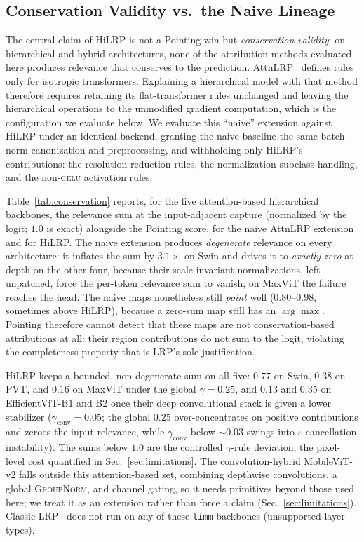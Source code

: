 \documentclass[lettersize,journal]{IEEEtran}
\theoremstyle{definition}
\theoremstyle{plain}
\begin{document}
\subsection{Conservation Validity vs.\ the Naive Lineage}
\label{sec:conservation-validity}
The central claim of HiLRP is not a Pointing win but \emph{conservation validity}: on hierarchical and hybrid architectures, none of the attribution methods evaluated here produces relevance that conserves to the prediction. AttnLRP~\cite{achtibat2024attnlrp} defines rules only for isotropic transformers. Explaining a hierarchical model with that method therefore requires retaining its flat-transformer rules unchanged and leaving the hierarchical operations to the unmodified gradient computation, which is the configuration we evaluate below. We evaluate this ``naive'' extension against HiLRP under an identical backend, granting the naive baseline the same batch-norm canonization and preprocessing, and withholding only HiLRP's contributions: the resolution-reduction rules, the normalization-subclass handling, and the non-\textsc{gelu} activation rules.

Table~\ref{tab:conservation} reports, for the five attention-based hierarchical backbones, the relevance sum at the input-adjacent capture (normalized by the logit; $1.0$ is exact) alongside the Pointing score, for the naive AttnLRP extension and for HiLRP. The naive extension produces \emph{degenerate} relevance on every architecture: it inflates the sum by $3.1\times$ on Swin and drives it to \emph{exactly zero} at depth on the other four, because their scale-invariant normalizations, left unpatched, force the per-token relevance sum to vanish; on MaxViT the failure reaches the head. The naive maps nonetheless still \emph{point} well ($0.80$--$0.98$, sometimes above HiLRP), because a zero-sum map still has an $\arg\max$. Pointing therefore cannot detect that these maps are not conservation-based attributions at all: their region contributions do not sum to the logit, violating the completeness property that is LRP's sole justification.

HiLRP keeps a bounded, non-degenerate sum on all five: $0.77$ on Swin, $0.38$ on PVT, and $0.16$ on MaxViT under the global $\gamma{=}0.25$, and $0.13$ and $0.35$ on EfficientViT-B1 and B2 once their deep convolutional stack is given a lower stabilizer ($\gamma_{\text{conv}}{=}0.05$; the global $0.25$ over-concentrates on positive contributions and zeroes the input relevance, while $\gamma_{\text{conv}}$ below ${\sim}0.03$ swings into $\varepsilon$-cancellation instability). The sums below $1.0$ are the controlled $\gamma$-rule deviation, the pixel-level cost quantified in Sec.~\ref{sec:limitations}. The convolution-hybrid MobileViT-v2 falls outside this attention-based set, combining depthwise convolutions, a global \textsc{GroupNorm}, and channel gating, so it needs primitives beyond those used here; we treat it as an extension rather than force a claim (Sec.~\ref{sec:limitations}). Classic LRP~\cite{bach2015lrp} does not run on any of these \texttt{timm} backbones (unsupported layer types).
\end{document}
